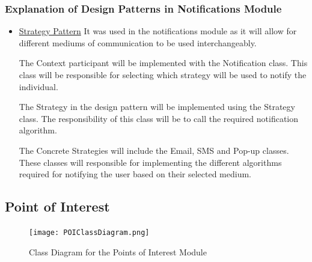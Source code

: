 \documentclass[runningheads,a4paper]{article}
\begin{document}
\subsubsection{Explanation of Design Patterns in Notifications Module}
\begin{itemize}
\item \underline{Strategy Pattern} It was used in the notifications module as it will allow for different mediums of communication to be used interchangeably.

The Context participant will be implemented with the Notification class. This class will be responsible for selecting which strategy will be used to notify the individual.

The Strategy in the design pattern will be implemented using the Strategy class. The responsibility of this class will be to call the required notification algorithm.

The Concrete Strategies will include the Email, SMS and Pop-up classes. These classes will responsible for implementing the different algorithms required for notifying the user based on their selected medium.
\end{itemize}


\subsection{Point of Interest}
\begin{figure}[H]
   	\centering
   	\texttt{[image: POIClassDiagram.png]}
   	\caption{Class Diagram for the Points of Interest Module}
\end{figure}
\end{document}
